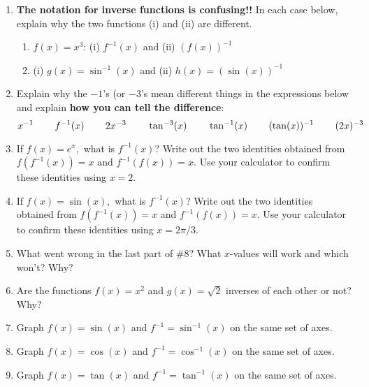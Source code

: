\documentclass[11pt,fleqn]{article}
\begin{document}
\begin{enumerate}
\item \textbf{The notation for inverse functions is confusing!!} In each case below, explain why the two functions (i) and (ii) are different.
	\begin{enumerate}
	\item $f(x)=x^3$: (i) $f^{-1}(x)$ and (ii) $(f(x))^{-1}$
	\vspace{.5in}
 	\item (i) $g(x)=\sin^{-1}(x)$ and (ii) $h(x)=(\sin (x))^{-1}$
	\vspace{.5in}
 	\end{enumerate}
\newpage
\item Explain why the $-1$'s (or $-3$'s mean different things in the expressions below and explain \textbf{how you can tell the difference}:\\
$$ x^{-1} \hspace{.3in}  f^{-1}(x) \hspace{.3in} 2x^{-3} \hspace{.3in}  \tan^{-3}(x) \hspace{.3in}  \tan^{-1}(x) \hspace{.3in}  (\tan(x))^{-1} \hspace{.3in} (2x)^{-3}$$
\vspace{1in}

\item If $f(x)=e^x,$ what is $f^{-1}(x)$? Write out the two identities obtained from $f(f^{-1}(x))=x$ and $f^{-1}(f(x))=x.$ Use your calculator to confirm these identities using $x=2.$
\vfill
\item If $f(x)=\sin(x),$ what is $f^{-1}(x)$? Write out the two identities obtained from $f(f^{-1}(x))=x$ and $f^{-1}(f(x))=x.$ Use your calculator to confirm these identities using $x=2\pi/3.$
\vfill

\item What went wrong in the last part of \#8? What $x$-values will work and which won't? Why?
\vfill

\item Are the functions $f(x) =x^2$ and $g(x)=\sqrt{2}$ inverses of each other or not? Why?
\vfill
\vfill
\newpage

\item Graph $f(x)=\sin (x)$ and $f^{-1}= \sin^{-1} (x)$ on the same set of axes.
\vfill
\item Graph $f(x)=\cos (x)$ and $f^{-1}= \cos^{-1} (x)$ on the same set of axes.
\vfill
\item Graph $f(x)=\tan (x)$ and $f^{-1}= \tan^{-1} (x)$ on the same set of axes.
\vfill
\end{enumerate}
\end{document}

